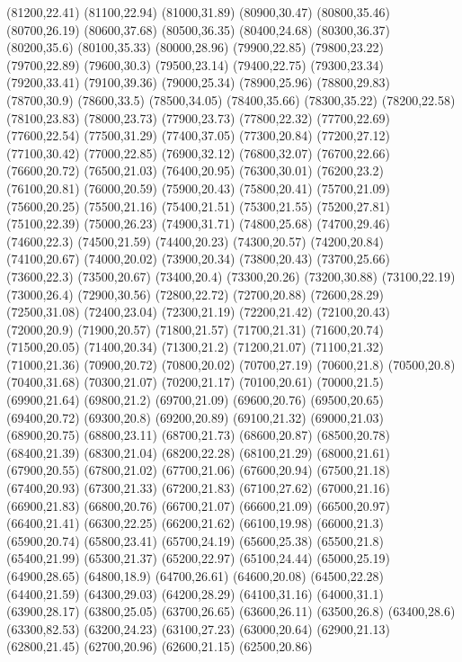 (81200,22.41)
(81100,22.94)
(81000,31.89)
(80900,30.47)
(80800,35.46)
(80700,26.19)
(80600,37.68)
(80500,36.35)
(80400,24.68)
(80300,36.37)
(80200,35.6)
(80100,35.33)
(80000,28.96)
(79900,22.85)
(79800,23.22)
(79700,22.89)
(79600,30.3)
(79500,23.14)
(79400,22.75)
(79300,23.34)
(79200,33.41)
(79100,39.36)
(79000,25.34)
(78900,25.96)
(78800,29.83)
(78700,30.9)
(78600,33.5)
(78500,34.05)
(78400,35.66)
(78300,35.22)
(78200,22.58)
(78100,23.83)
(78000,23.73)
(77900,23.73)
(77800,22.32)
(77700,22.69)
(77600,22.54)
(77500,31.29)
(77400,37.05)
(77300,20.84)
(77200,27.12)
(77100,30.42)
(77000,22.85)
(76900,32.12)
(76800,32.07)
(76700,22.66)
(76600,20.72)
(76500,21.03)
(76400,20.95)
(76300,30.01)
(76200,23.2)
(76100,20.81)
(76000,20.59)
(75900,20.43)
(75800,20.41)
(75700,21.09)
(75600,20.25)
(75500,21.16)
(75400,21.51)
(75300,21.55)
(75200,27.81)
(75100,22.39)
(75000,26.23)
(74900,31.71)
(74800,25.68)
(74700,29.46)
(74600,22.3)
(74500,21.59)
(74400,20.23)
(74300,20.57)
(74200,20.84)
(74100,20.67)
(74000,20.02)
(73900,20.34)
(73800,20.43)
(73700,25.66)
(73600,22.3)
(73500,20.67)
(73400,20.4)
(73300,20.26)
(73200,30.88)
(73100,22.19)
(73000,26.4)
(72900,30.56)
(72800,22.72)
(72700,20.88)
(72600,28.29)
(72500,31.08)
(72400,23.04)
(72300,21.19)
(72200,21.42)
(72100,20.43)
(72000,20.9)
(71900,20.57)
(71800,21.57)
(71700,21.31)
(71600,20.74)
(71500,20.05)
(71400,20.34)
(71300,21.2)
(71200,21.07)
(71100,21.32)
(71000,21.36)
(70900,20.72)
(70800,20.02)
(70700,27.19)
(70600,21.8)
(70500,20.8)
(70400,31.68)
(70300,21.07)
(70200,21.17)
(70100,20.61)
(70000,21.5)
(69900,21.64)
(69800,21.2)
(69700,21.09)
(69600,20.76)
(69500,20.65)
(69400,20.72)
(69300,20.8)
(69200,20.89)
(69100,21.32)
(69000,21.03)
(68900,20.75)
(68800,23.11)
(68700,21.73)
(68600,20.87)
(68500,20.78)
(68400,21.39)
(68300,21.04)
(68200,22.28)
(68100,21.29)
(68000,21.61)
(67900,20.55)
(67800,21.02)
(67700,21.06)
(67600,20.94)
(67500,21.18)
(67400,20.93)
(67300,21.33)
(67200,21.83)
(67100,27.62)
(67000,21.16)
(66900,21.83)
(66800,20.76)
(66700,21.07)
(66600,21.09)
(66500,20.97)
(66400,21.41)
(66300,22.25)
(66200,21.62)
(66100,19.98)
(66000,21.3)
(65900,20.74)
(65800,23.41)
(65700,24.19)
(65600,25.38)
(65500,21.8)
(65400,21.99)
(65300,21.37)
(65200,22.97)
(65100,24.44)
(65000,25.19)
(64900,28.65)
(64800,18.9)
(64700,26.61)
(64600,20.08)
(64500,22.28)
(64400,21.59)
(64300,29.03)
(64200,28.29)
(64100,31.16)
(64000,31.1)
(63900,28.17)
(63800,25.05)
(63700,26.65)
(63600,26.11)
(63500,26.8)
(63400,28.6)
(63300,82.53)
(63200,24.23)
(63100,27.23)
(63000,20.64)
(62900,21.13)
(62800,21.45)
(62700,20.96)
(62600,21.15)
(62500,20.86)
